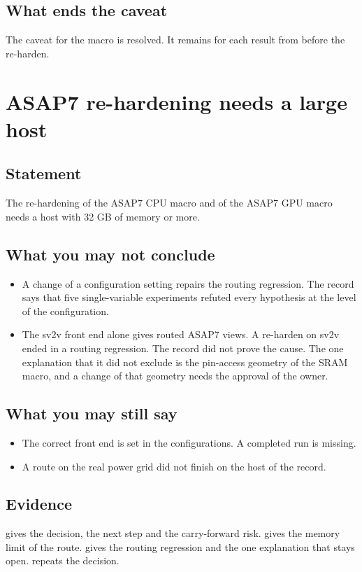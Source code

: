 \subsection*{What ends the caveat}
The caveat for the macro is resolved. It remains for each result from before the re-harden.

\section{ASAP7 re-hardening needs a large host}\label{tm:caveat:asap7-reharden-host}
\subsection*{Statement}
The re-hardening of the ASAP7 CPU macro and of the ASAP7 GPU macro needs a host with 32 GB of memory or more.

\subsection*{What you may not conclude}
\begin{itemize}
  \item A change of a configuration setting repairs the routing regression. The record says that five single-variable experiments refuted every hypothesis at the level of the configuration.
  \item The sv2v front end alone gives routed ASAP7 views. A re-harden on sv2v ended in a routing regression. The record did not prove the cause. The one explanation that it did not exclude is the pin-access geometry of the SRAM macro, and a change of that geometry needs the approval of the owner.
\end{itemize}

\subsection*{What you may still say}
\begin{itemize}
  \item The correct front end is set in the configurations. A completed run is missing.
  \item A route on the real power grid did not finish on the host of the record.
\end{itemize}

\subsection*{Evidence}
 gives the decision, the next step and the carry-forward risk.  gives the memory limit of the route.  gives the routing regression and the one explanation that stays open.  repeats the decision.

